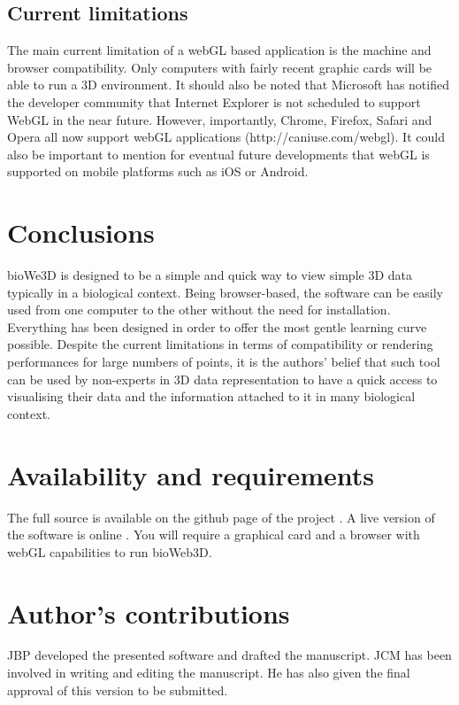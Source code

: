 \documentclass[10pt]{bmc_article}
\newenvironment{bmcformat}{\baselineskip20pt\sloppy\setboolean{publ}{false}}{\baselineskip20pt\sloppy}
\begin{document}
\begin{bmcformat}
	\subsection{Current limitations}
The main current limitation of a webGL based application is the machine and browser compatibility. Only computers with fairly recent graphic cards will be able to run a 3D environment. It should also be noted that Microsoft has notified the developer community that Internet Explorer is not scheduled to support WebGL in the near future. However, importantly, Chrome, Firefox, Safari and Opera all now support webGL applications (http://caniuse.com/webgl). It could also be important to mention for eventual future developments that webGL is supported on mobile platforms such as iOS or Android.

\section{Conclusions}
bioWe3D is designed to be a simple and quick way to view simple 3D data typically in a biological context.  Being browser-based, the software can be easily used from one computer to the other without the need for installation. Everything has been designed in order to offer the most gentle learning curve possible. Despite the current limitations in terms of compatibility or rendering performances for large numbers of points, it is the authors' belief that such tool can be used by non-experts in 3D data representation to have a quick access to visualising their data and the information attached to it in many biological context.

\section{Availability and requirements}
The full source is available on the github page of the project \cite{github}. A live version of the software is online \cite{bioWeb3D}. You will require a graphical card and a browser with webGL capabilities to run bioWeb3D.




\bigskip

\section*{Author's contributions}
JBP developed the presented software and drafted the manuscript. JCM has been involved in writing and editing the manuscript. He has also given the final approval of this version to be submitted.


\end{bmcformat}
\end{document}
